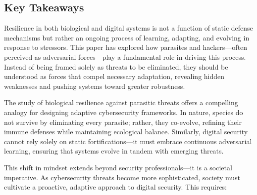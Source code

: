 \documentclass{article}
\begin{document}
\subsection{Key Takeaways}
Resilience in both biological and digital systems is not a function of static defense mechanisms but rather an ongoing process of learning, adapting, and evolving in response to stressors. This paper has explored how parasites and hackers—often perceived as adversarial forces—play a fundamental role in driving this process. Instead of being framed solely as threats to be eliminated, they should be understood as forces that compel necessary adaptation, revealing hidden weaknesses and pushing systems toward greater robustness.

The study of biological resilience against parasitic threats offers a compelling analogy for designing adaptive cybersecurity frameworks. In nature, species do not survive by eliminating every parasite; rather, they co-evolve, refining their immune defenses while maintaining ecological balance. Similarly, digital security cannot rely solely on static fortifications—it must embrace continuous adversarial learning, ensuring that systems evolve in tandem with emerging threats.

This shift in mindset extends beyond security professionals—it is a societal imperative. As cybersecurity threats become more sophisticated, society must cultivate a proactive, adaptive approach to digital security. This requires:
\end{document}
